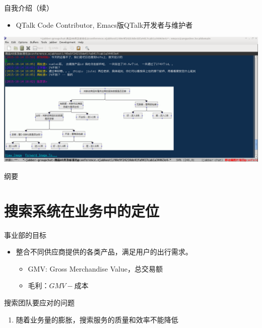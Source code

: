 \documentclass[handout]{beamer}
\begin{document}
\begin{CJK}{UTF8}{gbsn}
\begin{frame}{自我介绍（续）}
  \begin{itemize}
  \item {QTalk Code Contributor, Emacs版QTalk开发者与维护者}
  \end{itemize}
  \begin{center}
    \includegraphics[scale=0.3]{./images/qtalk-emacs-screenshot}
  \end{center}
\end{frame}

\begin{frame}{纲要}
  \tableofcontents
\end{frame}

\section{搜索系统在业务中的定位}


\begin{frame}{事业部的目标}
  \begin{itemize}
  \item { 整合不同供应商提供的各类产品，满足用户的出行需求。
    \begin{itemize}
      \item<2-> { GMV: Gross Merchandise Value，总交易额 }
      \item<2-> { 毛利：$GMV - \text{成本} $ }
    \end{itemize}
  }
  \end{itemize}
\end{frame}

\begin{frame}{搜索团队要应对的问题}
  \begin{enumerate}
    \item { 随着业务量的膨胀，搜索服务的质量和效率不能降低 }
  \end{enumerate}
    \begin{center}
      \plotGMVGrowthChart[scale=0.65]
    \end{center}
\end{frame}



\end{CJK}
\end{document}
